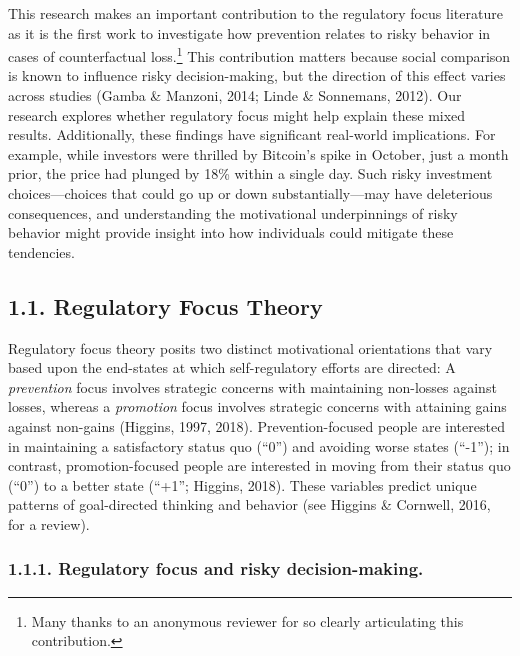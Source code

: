 \documentclass[man,floatsintext]{apa6}
\let\rmarkdownfootnote\footnote%
\def\footnote{\protect\rmarkdownfootnote}
\begin{document}
This research makes an important contribution to the regulatory focus literature as it is the first work to investigate how prevention relates to risky behavior in cases of counterfactual loss.\footnote{Many thanks to an anonymous reviewer for so clearly articulating this contribution.} This contribution matters because social comparison is known to influence risky decision-making, but the direction of this effect varies across studies (Gamba \& Manzoni, 2014; Linde \& Sonnemans, 2012). Our research explores whether regulatory focus might help explain these mixed results. Additionally, these findings have significant real-world implications. For example, while investors were thrilled by Bitcoin's spike in October, just a month prior, the price had plunged by 18\% within a single day. Such risky investment choices---choices that could go up or down substantially---may have deleterious consequences, and understanding the motivational underpinnings of risky behavior might provide insight into how individuals could mitigate these tendencies.

\hypertarget{regulatory-focus-theory}{%
\subsection{1.1. Regulatory Focus Theory}\label{regulatory-focus-theory}}

Regulatory focus theory posits two distinct motivational orientations that vary based upon the end-states at which self-regulatory efforts are directed: A \emph{prevention} focus involves strategic concerns with maintaining non-losses against losses, whereas a \emph{promotion} focus involves strategic concerns with attaining gains against non-gains (Higgins, 1997, 2018). Prevention-focused people are interested in maintaining a satisfactory status quo (\enquote{0}) and avoiding worse states (\enquote{-1}); in contrast, promotion-focused people are interested in moving from their status quo (\enquote{0}) to a better state (``+1''; Higgins, 2018). These variables predict unique patterns of goal-directed thinking and behavior (see Higgins \& Cornwell, 2016, for a review).

\hypertarget{regulatory-focus-and-risky-decision-making.}{%
\subsubsection{1.1.1. Regulatory focus and risky decision-making.}\label{regulatory-focus-and-risky-decision-making.}}
\end{document}
